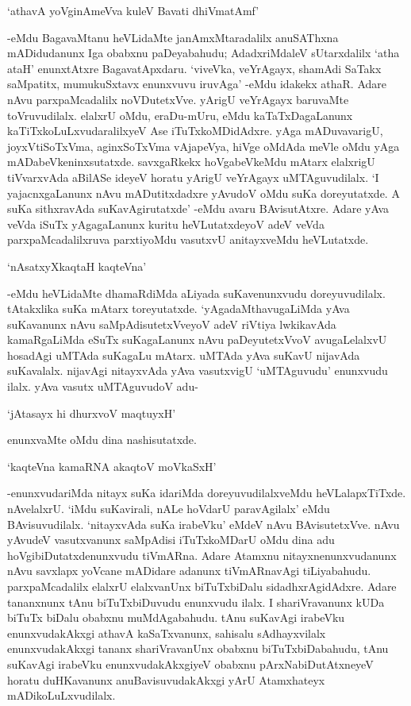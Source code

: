 \begin{shloka}
`athavA yoVginAmeVva kuleV Bavati dhiVmatAmf'
\end{shloka}

-eMdu BagavaMtanu heVLidaMte janAmxMtaradalilx anuSAThxna mADidudanunx Iga obabxnu paDeyabahudu; AdadxriMdaleV sUtarxdalilx `atha ataH' enunxtAtxre BagavatApxdaru. `viveVka, veYrAgayx, shamAdi SaTakx saMpatitx, mumukuSxtavx enunxvuvu iruvAga' -eMdu idakekx athaR. Adare nAvu parxpaMcadalilx noVDutetxVve. yArigU veYrAgayx baruvaMte toVruvudilalx. elalxrU oMdu, eraDu-mUru, eMdu kaTaTxDagaLanunx kaTiTxkoLuLxvudaralilxyeV Ase iTuTxkoMDidAdxre. yAga mADuvavarigU, joyxVtiSoTxVma, aginxSoTxVma vAjapeVya, hiVge oMdAda meVle oMdu yAga mADabeVkeninxsutatxde. savxgaRkekx hoVgabeVkeMdu mAtarx elalxrigU tiVvarxvAda aBilASe ideyeV horatu yArigU veYrAgayx uMTAguvudilalx. `I yajacnxgaLanunx nAvu mADutitxdadxre yAvudoV oMdu suKa doreyutatxde. A suKa sithxravAda suKavAgirutatxde' -eMdu avaru BAvisutAtxre. Adare yAva veVda iSuTx yAgagaLanunx kuritu heVLutatxdeyoV adeV veVda parxpaMcadalilxruva parxtiyoMdu vasutxvU anitayxveMdu heVLutatxde.

\begin{shloka}
`nAsatxyXkaqtaH kaqteVna'
\end{shloka}

-eMdu heVLidaMte dhamaRdiMda aLiyada suKavenunxvudu doreyuvudilalx. tAtakxlika suKa mAtarx toreyutatxde. `yAgadaMthavugaLiMda yAva suKavanunx nAvu saMpAdisutetxVveyoV adeV riVtiya lwkikavAda kamaRgaLiMda eSuTx suKagaLanunx nAvu paDeyutetxVvoV avugaLelalxvU hosadAgi uMTAda suKagaLu mAtarx. uMTAda yAva suKavU nijavAda suKavalalx. nijavAgi nitayxvAda yAva vasutxvigU `uMTAguvudu' enunxvudu ilalx. yAva vasutx uMTAguvudoV adu-

\begin{shloka}
`jAtasayx hi dhurxvoV maqtuyxH'
\end{shloka}

enunxvaMte oMdu dina nashisutatxde.

\begin{shloka}
`kaqteVna kamaRNA akaqtoV moVkaSxH'
\end{shloka}

-enunxvudariMda nitayx suKa idariMda doreyuvudilalxveMdu heVLalapxTiTxde. nAvelalxrU. `iMdu suKavirali, nALe hoVdarU paravAgilalx' eMdu BAvisuvudilalx. `nitayxvAda suKa irabeVku' eMdeV nAvu BAvisutetxVve. nAvu yAvudeV vasutxvanunx saMpAdisi iTuTxkoMDarU oMdu dina adu hoVgibiDutatxdenunxvudu tiVmARna. Adare Atamxnu nitayxnenunxvudanunx nAvu savxlapx yoVcane mADidare adanunx tiVmARnavAgi tiLiyabahudu. parxpaMcadalilx elalxrU elalxvanUnx biTuTxbiDalu sidadhxrAgidAdxre. Adare tananxnunx tAnu biTuTxbiDuvudu enunxvudu ilalx. I shariVravanunx kUDa biTuTx biDalu obabxnu muMdAgabahudu. tAnu suKavAgi irabeVku enunxvudakAkxgi athavA kaSaTxvanunx, sahisalu sAdhayxvilalx enunxvudakAkxgi tananx shariVravanUnx obabxnu biTuTxbiDabahudu, tAnu suKavAgi irabeVku enunxvudakAkxgiyeV obabxnu pArxNabiDutAtxneyeV horatu duHKavanunx anuBavisuvudakAkxgi yArU Atamxhateyx mADikoLuLxvudilalx.

